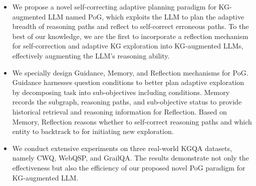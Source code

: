 \documentclass{article}
\begin{document}
\begin{itemize}[leftmargin=1cm] 
    \item We propose a novel self-correcting adaptive planning paradigm for KG-augmented LLM named PoG, which exploits the LLM to plan the adaptive breadth of reasoning paths and reflect to self-correct erroneous paths.
To the best of our knowledge, we are the first to incorporate a reflection mechanism for self-correction and adaptive KG exploration into KG-augmented LLMs, effectively augmenting the LLM's reasoning ability.
    \item We specially design Guidance, Memory, and Reflection mechanisms for PoG. 
Guidance harnesses question conditions to better plan adaptive exploration by decomposing task into sub-objectives including conditions.
Memory records the subgraph, reasoning paths, and sub-objective status to provide historical retrieval and reasoning information for Reflection.
Based on Memory, Reflection reasons whether to self-correct reasoning paths and which entity to backtrack to for initiating new exploration.
    \item We conduct extensive experiments on three real-world KGQA datasets, namely CWQ, WebQSP, and GrailQA. The results demonstrate not only the effectiveness but also the efficiency of our proposed novel PoG paradigm for KG-augmented LLM.
\end{itemize}
\vspace{-1.5mm}
\end{document}
